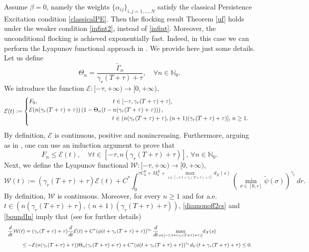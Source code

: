 \documentclass[11pt]{article}
\begin{document}
	\begin{oss}[Case $\beta=0$]\label{beta=0}
			Assume $\beta=0$, namely the weights $\{\alpha_{ij}\}_{i,j=1,\dots,N}$ satisfy the {classical Persistence Excitation condition \eqref{classicalPE}.} Then the flocking result Theorem \ref{uf} holds under the weaker condition \eqref{infint2}, instead of \eqref{infint}. Moreover, the unconditional flocking is achieved exponentially fast. Indeed, in this case we can perform the Lyapunov functional approach in \cite{CCP}. We provide here just some details. 
            \\Let us define
		$$\Theta_n=\frac{\tilde\Gamma_{n}}{\gamma_r(T+\tau)+\tau}, \quad\forall n\in \mathbb{N}_0.$$
		We introduce the function $\mathcal{E}:[-\tau,+\infty)\rightarrow [0,+\infty),$ 
		$$\mathcal{E}(t):=\begin{cases}
			F_{0}, \hspace{4.5cm}t\in [-\tau,\gamma_r(T+\tau)+\tau],\\
            \mathcal{E}(n(\gamma_r(T+\tau)+\tau))\left(1-\Theta_n(t-n(\gamma_r(T+\tau)+\tau))\right), \\
            \vspace{0.2cm}\hspace{5cm}t\in (n(\gamma_r(T+\tau)+\tau),(n+1)(\gamma_r(T+\tau)+\tau)],\,n\geq 1.
		\end{cases}$$
		By definition, $\mathcal{E}$ is continuous, positive and nonincreasing. Furthermore, arguing as in \cite{CCP}, one can use an induction argument to prove that
        \begin{equation}\label{boundIn}
			F_{n}\leq \mathcal{E}(t),\quad \forall t\in [-\tau,n(\gamma_r(T+\tau)+\tau)],\,\forall n\in\mathbb{N}_0.
		\end{equation} 
	Next, we define the Lyapunov functional $\mathcal{W}:[-\tau,+\infty)\rightarrow [0,+\infty)$, 
 $$\mathcal{W}(t):=(\gamma_r(T+\tau)+\tau)\mathcal{E}(t)+C^*\int_{0}^{\tau C^{V}_{0}+M^{X}_{0}+\underset{s\in [-\tau,t+\gamma_r(T+\tau)+\tau]}{\max}d_{X}(s)}\left(\min_{\sigma\in [0,r]}\tilde\psi(\sigma)\right)^{\gamma_r}\,dr.$$
By definition, $\mathcal{W}$ is continuous. Moreover, for every $n\geq 1$ and for a.e. $t\in(n(\gamma_r(T+\tau)+\tau),(n+1)(\gamma_r(T+\tau)+\tau)) $, \eqref{diamonoff2cs} and \eqref{boundIn} imply that (see \cite{CCP} for further details)
      $$ \begin{array}{l}		\vspace{0.3cm}\displaystyle{ \frac{d}{dt}\mathcal{W}(t)=(\gamma_r(T+\tau)+\tau)\frac{d}{dt}\mathcal{E}(t)+C^*(\phi(t+\gamma_r(T+\tau)+\tau))^{\gamma_r}\,\frac{d}{dt}\underset{s\in [-\tau,t+(\gamma_r(T+\tau)+\tau)]}{\max}d_{X}(s)}\\          \displaystyle{\hspace{1cm}\leq-\mathcal{E}(n(\gamma_r(T+\tau)+\tau))\Theta_n(\gamma_r(T+\tau)+\tau)+C^*(\phi(t+\gamma_r(T+\tau)+\tau))^{\gamma_r}d_V(t+\gamma_r(T+\tau)+\tau)\leq 0.}       

\end{array}$$
\end{oss}
\end{document}
